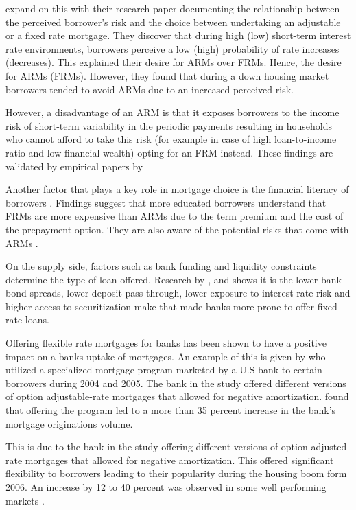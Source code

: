 \documentclass[
  letterpaper,
  DIV=11,
  numbers=noendperiod]{scrartcl}
\begin{document}
\citet{kim2016borrower} expand on this with their research paper
documenting the relationship between the perceived borrower's risk and
the choice between undertaking an adjustable or a fixed rate mortgage.
They discover that during high (low) short-term interest rate
environments, borrowers perceive a low (high) probability of rate
increases (decreases). This explained their desire for ARMs over FRMs.
Hence, the desire for ARMs (FRMs). However, they found that during a
down housing market borrowers tended to avoid ARMs due to an increased
perceived risk.

However, a disadvantage of an ARM is that it exposes borrowers to the
income risk of short-term variability in the periodic payments resulting
in households who cannot afford to take this risk (for example in case
of high loan-to-income ratio and low financial wealth) opting for an FRM
instead. These findings are validated by empirical papers by
\citep{paiella2007choosing, fornero2011effect, ehrmann2017mortgage}

Another factor that plays a key role in mortgage choice is the financial
literacy of borrowers
\citep{gathergood2017financial, fornero2011effect, agarwal2012adverse}.
Findings suggest that more educated borrowers understand that FRMs are
more expensive than ARMs due to the term premium and the cost of the
prepayment option. They are also aware of the potential risks that come
with ARMs \citep{fornero2011effect}.

On the supply side, factors such as bank funding and liquidity
constraints determine the type of loan offered. Research by
\citet{fuster2015securitization}, and \citet{basten2017banks} shows it
is the lower bank bond spreads, lower deposit pass-through, lower
exposure to interest rate risk and higher access to securitization make
that made banks more prone to offer fixed rate loans.

Offering flexible rate mortgages for banks has been shown to have a
positive impact on a banks uptake of mortgages. An example of this is
given by \citet{cocco2013evidence} who utilized a specialized mortgage
program marketed by a U.S bank to certain borrowers during 2004 and
2005. The bank in the study offered different versions of option
adjustable-rate mortgages that allowed for negative amortization.
\citet{cocco2013evidence} found that offering the program led to a more
than 35 percent increase in the bank's mortgage originations volume.

This is due to the bank in the study offering different versions of
option adjusted rate mortgages that allowed for negative amortization.
This offered significant flexibility to borrowers leading to their
popularity during the housing boom form 2006. An increase by 12 to 40
percent was observed in some well performing markets
\citep{piskorski2010optimal, krainer2014mortgage}.
\end{document}
